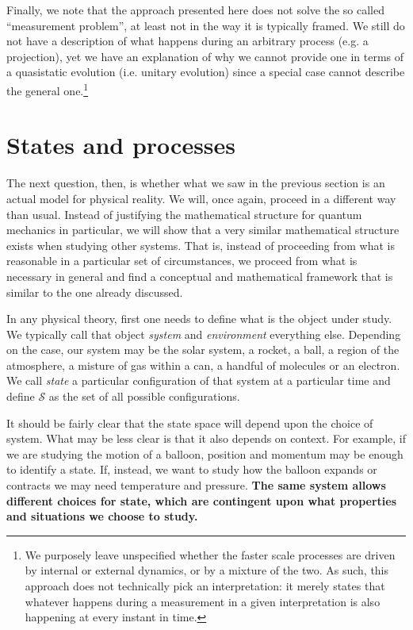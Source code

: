 \documentclass[applsci,article,submit,moreauthors,pdftex]{Definitions/mdpi}
\begin{document}
Finally, we note that the approach presented here does not solve the so called ``measurement problem''\cite{Genovese,Bassi}, at least not in the way it is typically framed. We still do not have a description of what happens during an arbitrary process (e.g. a projection), yet we have an explanation of why we cannot provide one in terms of a quasistatic evolution (i.e. unitary evolution) since a special case cannot describe the general one.\footnote{We purposely leave unspecified whether the faster scale processes are driven by internal or external dynamics, or by a mixture of the two. As such, this approach does not technically pick an interpretation: it merely states that whatever happens during a measurement in a given interpretation is also happening at every instant in time.}

\section{States and processes}

The next question, then, is whether what we saw in the previous section is an actual model for physical reality. We will, once again, proceed in a different way than usual. Instead of justifying the mathematical structure for quantum mechanics in particular, we will show that a very similar mathematical structure exists when studying other systems. That is, instead of proceeding from what is reasonable in a particular set of circumstances, we proceed from what is necessary in general and find a conceptual and mathematical framework that is similar to the one already discussed.

In any physical theory, first one needs to define what is the object under study. We typically call that object \emph{system} and \emph{environment} everything else. Depending on the case, our system may be the solar system, a rocket, a ball, a region of the atmosphere, a misture of gas within a can, a handful of molecules or an electron. We call \emph{state} a particular configuration of that system at a particular time and define $\mathcal{S}$ as the set of all possible configurations.

It should be fairly clear that the state space will depend upon the choice of system. What may be less clear is that it also depends on context. For example, if we are studying the motion of a balloon, position and momentum may be enough to identify a state. If, instead, we want to study how the balloon expands or contracts we may need temperature and pressure. \textbf{The same system allows different choices for state, which are contingent upon what properties and situations we choose to study.} 
\end{document}
